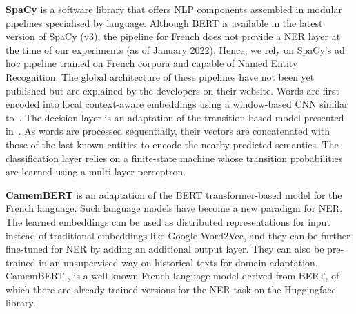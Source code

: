 \textbf{SpaCy} is a software library that offers NLP components assembled in modular pipelines specialised by language.
Although BERT is available in the latest version of SpaCy (v3), the pipeline for French does not provide a NER layer at the time of our experiments (as of January 2022).
Hence, we rely on SpaCy's ad hoc pipeline trained on French corpora and capable of Named Entity Recognition.
The global architecture of these pipelines have not been yet published but are explained by the developers on their website.
Words are first encoded into local context-aware embeddings using a window-based CNN similar to~\cite{collobert2011}.
The decision layer is an adaptation of the transition-based model presented in~\cite{lample2016}.
As words are processed sequentially, their vectors are concatenated with those of the last known entities to encode the nearby predicted semantics.
The classification layer relies on a finite-state machine whose transition probabilities are learned using a multi-layer perceptron.



\textbf{CamemBERT} is an adaptation of the BERT transformer-based model for the French language\cite{vaswani2017attention,devlin2018bert}. Such language models have become a new paradigm for NER\cite{li2020}. 
The learned embeddings can be used as distributed representations for input instead of traditional embeddings like Google Word2Vec, and they can be further fine-tuned for NER by adding an additional output layer. 
They can also be pre-trained in an unsupervised way on historical texts for domain adaptation.
CamemBERT \cite{martin-etal-2020-camembert}, is a well-known French language model derived from BERT, of which there are already trained versions for the NER task on the Huggingface library.

